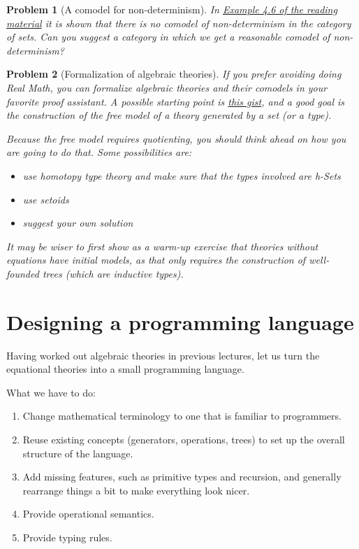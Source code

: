 \documentclass{article}
\newtheorem{problem}{Problem}[section]}
\begin{document}
\begin{problem}[A comodel for non-determinism]
  In \href{https://arxiv.org/abs/1807.05923}{Example 4.6 of the reading
    material} it is shown that there is no comodel of non-determinism in the
  category of sets. Can you suggest a category in which we get a reasonable
  comodel of non-determinism?
\end{problem}

\begin{problem}[Formalization of algebraic theories]

If you prefer avoiding doing Real Math, you can formalize algebraic
theories and their comodels in your favorite proof assistant. A possible
starting point is
\href{https://gist.github.com/andrejbauer/3cc438ab38646516e5e9278fdb22022c}{this
gist}, and a good goal is the construction of the free model of a theory
generated by a set (or a type).

Because the free model requires quotienting, you should think ahead on
how you are going to do that. Some possibilities are:
%
\begin{itemize}
\item
  use homotopy type theory and make sure that the types involved are
  h-Sets
\item
  use setoids
\item
  suggest your own solution
\end{itemize}
%
It may be wiser to first show as a warm-up exercise that theories
without equations have initial models, as that only requires the
construction of well-founded trees (which are inductive types).
\end{problem}

\section{Designing a programming language}

Having worked out algebraic theories in previous lectures, let us turn the
equational theories into a small programming language.

What we have to do:
%
\begin{enumerate}
\item Change mathematical terminology to one that is familiar to programmers.
\item Reuse existing concepts (generators, operations, trees) to set up the overall
   structure of the language.
\item Add missing features, such as primitive types and recursion, and generally
   rearrange things a bit to make everything look nicer.
\item Provide operational semantics.
\item Provide typing rules.
\end{enumerate}
\end{document}
